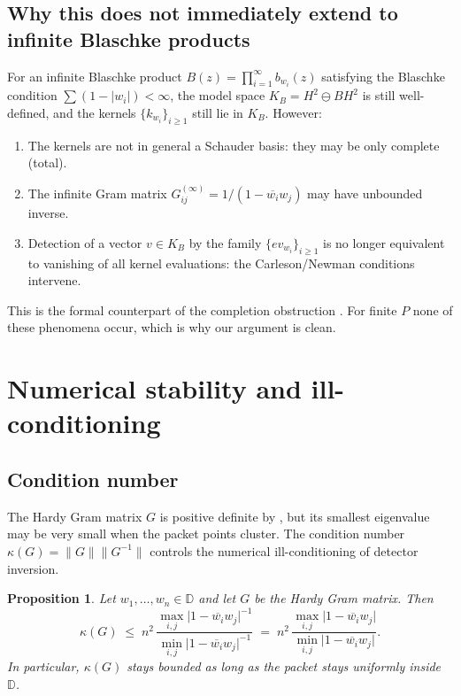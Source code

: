 \documentclass[12pt]{article}
\newtheorem{proposition}[theorem]{Proposition}
\theoremstyle{definition}
\theoremstyle{remark}
\newcommand{\D}{\mathbb{D}}
\newcommand{\HHH}{H^{2}}
\newcommand{\norm}[1]{\lVert #1 \rVert}
\newcommand{\abs}[1]{\lvert #1 \rvert}
\newcommand{\conj}[1]{\overline{#1}}
\begin{document}
\subsection{Why this does not immediately extend to infinite Blaschke products}

For an infinite Blaschke product $B(z)=\prod_{i=1}^{\infty}b_{w_{i}}(z)$
satisfying the Blaschke condition $\sum(1-\abs{w_{i}})<\infty$, the
model space $K_{B}=\HHH\ominus B\HHH$ is still well-defined, and the
kernels $\{k_{w_{i}}\}_{i\ge1}$ still lie in $K_{B}$. However:
\begin{enumerate}\itemsep0pt
  \item The kernels are not in general a Schauder basis: they may be
        only complete (total).
  \item The infinite Gram matrix
        $G^{(\infty)}_{ij}=1/(1-\conj{w_{i}}w_{j})$ may have unbounded
        inverse.
  \item Detection of a vector $v\in K_{B}$ by the family
        $\{ev_{w_{i}}\}_{i\ge1}$ is no longer equivalent to vanishing
        of all kernel evaluations: the Carleson/Newman conditions
        intervene.
\end{enumerate}
This is the formal counterpart of the completion obstruction
. For finite $P$ none of these phenomena occur,
which is why our argument is clean.

\section{Numerical stability and ill-conditioning}\label{sec:stability}

\subsection{Condition number}

The Hardy Gram matrix $G$ is positive definite by
, but its smallest eigenvalue may be very small
when the packet points cluster. The condition number
$\kappa(G)=\norm{G}\norm{G^{-1}}$ controls the numerical
ill-conditioning of detector inversion.

\begin{proposition}\label{prop:condition}
Let $w_{1},\dots,w_{n}\in\D$ and let $G$ be the Hardy Gram matrix. Then
\begin{equation}\label{eq:cond-bound}
  \kappa(G)\;\le\;n^{2}\,\frac{\max_{i,j}\abs{1-\conj{w_{i}}w_{j}}^{-1}}
                                {\min_{i,j}\abs{1-\conj{w_{i}}w_{j}}^{-1}}
   \;=\;n^{2}\,\frac{\max_{i,j}\abs{1-\conj{w_{i}}w_{j}}}
                     {\min_{i,j}\abs{1-\conj{w_{i}}w_{j}}}.
\end{equation}
In particular, $\kappa(G)$ stays bounded as long as the packet stays
uniformly inside $\D$.
\end{proposition}
\end{document}
